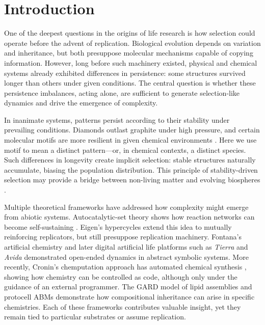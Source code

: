 \documentclass[life,article,submit,pdftex,moreauthors]{Definitions/mdpi}
\begin{document}
\section{Introduction}

One of the deepest questions in the origins of life research is how selection could operate before the advent of replication. Biological evolution depends on variation and inheritance, but both presuppose molecular mechanisms capable of copying information. However, long before such machinery existed, physical and chemical systems already exhibited differences in persistence: some structures survived longer than others under given conditions. The central question is whether these persistence imbalances, acting alone, are sufficient to generate selection-like dynamics and drive the emergence of complexity.

In inanimate systems, patterns persist according to their stability under prevailing conditions. Diamonds outlast graphite under high pressure, and certain molecular motifs are more resilient in given chemical environments \cite{ruizmirazo2014}. Here we use motif to mean a distinct pattern—or, in chemical contexts, a distinct species. Such differences in longevity create implicit selection: stable structures naturally accumulate, biasing the population distribution. This principle of stability-driven selection may provide a bridge between non-living matter and evolving biospheres \cite{kauffman1993origins, hordijk2012autocatalytic, nghe2015prebiotic}.

Multiple theoretical frameworks have addressed how complexity might emerge from abiotic systems. Autocatalytic-set theory shows how reaction networks can become self-sustaining \cite{kauffman1986autocatalytic, hordijk2011required}. Eigen's hypercycles \cite{eigen} extend this idea to mutually reinforcing replicators, but still presuppose replication machinery. Fontana's artificial chemistry \cite{fontana1991algorithmic} and later digital artificial life platforms such as \textit{Tierra} and \textit{Avida} \cite{ray1992tierra, adami1994} demonstrated open-ended dynamics in abstract symbolic systems. More recently, Cronin’s chemputation approach has automated chemical synthesis \cite{cronin2024chemputation}, showing how chemistry can be controlled as code, although only under the guidance of an external programmer. The GARD model of lipid assemblies \cite{segre2000compositional, markovitch2012universal} and protocell ABMs \cite{damer2015coupled} demonstrate how compositional inheritance can arise in specific chemistries. Each of these frameworks contributes valuable insight, yet they remain tied to particular substrates or assume replication.
\end{document}
